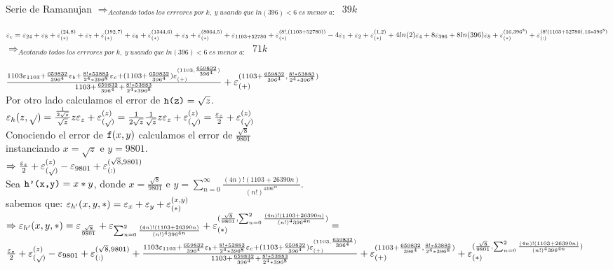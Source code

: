\begin{subsection}{Serie de Ramanujan}
	$\Rightarrow_{Acotando\;todos\;los\;errrores\;por\;k,\;y\;usando\;que\;ln(396)<6\;es\;menor\;a:}$ $39k$
	
	\VSP
	$\varepsilon _{c}=\varepsilon _{24}+\varepsilon _{8}+\varepsilon _{({*})}^{({24,8})}+\varepsilon _{7}+\varepsilon _{({*})}^{({192,7})}+\varepsilon _{6}+\varepsilon _{({*})}^{({1344,6})}+\varepsilon _{5}+\varepsilon _{({*})}^{({8064,5})}+\varepsilon _{1103+52780}+\varepsilon _{({*})}^{({8!,(1103+52780)})}-4\varepsilon _{1}+\varepsilon _{2}+\varepsilon _{({*})}^{({1,2})}+4ln(2)\varepsilon _{4}+8\varepsilon _{396}+8ln(396)\varepsilon _{8}+\varepsilon _{({*})}^{({16,396^8})}+\varepsilon _{({:})}^{({8!(1103+52780),16*396^8})}$\\
	
	$\Rightarrow_{Acotando\;todos\;los\;errrores\;por\;k,\;y\;usando\;que\;ln(396)<6\;es\;menor\;a:}$ $71k$
	
	\VSP
	
	$\frac{1103\varepsilon _{1103}+\frac{659832}{396^4}\varepsilon _{b} + \frac{8!*53883}{2^4*396^8}\varepsilon _{c} + (1103+\frac{659832}{396^4})\varepsilon _{({+})}^{({1103,\frac{659832}{396^4}})}}{1103+\frac{659832}{396^4}+\frac{8!*53883}{2^4*396^8}} + \varepsilon _{({+})}^{({1103+\frac{659832}{396^4},\frac{8!*53883}{2^4*396^8}})}$\\
	
	Por otro lado calculamos el error de $\texttt{h(z)}=\sqrt{z}$.\\
	
	$\varepsilon _{h}({z,\sqrt{ }}) = \frac{\frac{1}{2\sqrt{z}}}{\sqrt{z}}z\varepsilon _{z} + \varepsilon _{({\sqrt{ }})}^{({z})} = \frac{1}{2\sqrt{z}}\frac{1}{\sqrt{z}}z\varepsilon _{z} + \varepsilon _{({\sqrt{ }})}^{({z})} = \frac{\varepsilon _{z}}{2} + \varepsilon _{({\sqrt{ }})}^{({z})}$\\
	
	Conociendo el error de $\texttt{f}(x,y)$ calculamos el error de $\frac{\sqrt{8}}{9801}$\\ instanciando $x=\sqrt{z}$ e $y=9801$.\\
	
	$\Rightarrow \frac{\varepsilon _{z}}{2} + \varepsilon _{({\sqrt{ }})}^{({z})} - \varepsilon _{9801} + \varepsilon _{({:})}^{({\sqrt{8},9801})}$\\
	
	Sea $\texttt{h'(x,y)}=x*y$, donde $x=\frac{\sqrt{8}}{9801}$ e $y=\sum_{n=0}^{\infty}{\frac{(4n)!(1103+26390n)}{(n!)^4396^{4n}}}$.\\
	
	sabemos que: $\varepsilon _{h'}({x,y,*}) = \varepsilon _{x} + \varepsilon _{y} + \varepsilon _{({*})}^{({x,y})}$\\
	
	$\Rightarrow \varepsilon _{h'}({x,y,*}) = \varepsilon _{\frac{\sqrt{8}}{9801}} + \varepsilon _{\sum_{n=0}^{2}{\frac{(4n)!(1103+26390n)}{(n!)^4396^{4n}}}} + \varepsilon _{({*})}^{({\frac{\sqrt{8}}{9801},\sum_{n=0}^{2}{\frac{(4n)!(1103+26390n)}{(n!)^4396^{4n}}}})} = $\\
	
	$\frac{\varepsilon _{z}}{2}+\varepsilon _{({\sqrt{}})}^{({z})}-\varepsilon _{9801}+\varepsilon _{({:})}^{({\sqrt{8},9801})}+\frac{1103\varepsilon _{1103}+\frac{659832}{396^4}\varepsilon _{b}+ \frac{8!*53883}{2^4*396^8}\varepsilon _{c}+(1103+\frac{659832}{396^4})\varepsilon _{({+})}^{({1103,\frac{659832}{396^4}})}}{1103+\frac{659832}{396^4} +\frac{8!*53883}{2^4*396^8}} + \varepsilon _{({+})}^{({1103+\frac{659832}{396^4},\frac{8!*53883}{2^4*396^8}})} + \varepsilon _{({*})}^{({\frac{\sqrt{8}}{9801},\sum_{n=0}^{2}{\frac{(4n)!(1103+26390n)}{(n!)^4396^{4n}}}})}$\\
	

\end{subsection}
